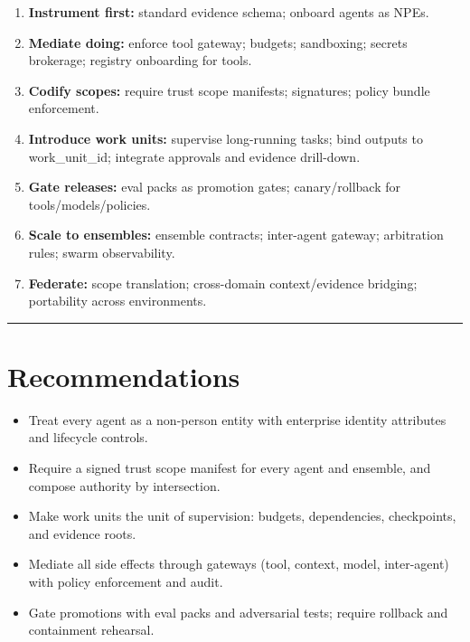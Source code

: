 \documentclass[11pt]{article}
\begin{document}
\begin{enumerate}
\def\labelenumi{\arabic{enumi}.}
\tightlist
\item
  \textbf{Instrument first:} standard evidence schema; onboard agents as
  NPEs.
\item
  \textbf{Mediate doing:} enforce tool gateway; budgets; sandboxing;
  secrets brokerage; registry onboarding for tools.
\item
  \textbf{Codify scopes:} require trust scope manifests; signatures;
  policy bundle enforcement.
\item
  \textbf{Introduce work units:} supervise long-running tasks; bind
  outputs to work\_unit\_id; integrate approvals and evidence
  drill-down.
\item
  \textbf{Gate releases:} eval packs as promotion gates; canary/rollback
  for tools/models/policies.
\item
  \textbf{Scale to ensembles:} ensemble contracts; inter-agent gateway;
  arbitration rules; swarm observability.
\item
  \textbf{Federate:} scope translation; cross-domain context/evidence
  bridging; portability across environments.
\end{enumerate}

\vspace{2pt}\begin{center}\rule{0.62\linewidth}{0.6pt}\end{center}\vspace{2pt}

\hypertarget{recommendations}{%
\section{Recommendations}\label{recommendations}}

\begin{itemize}
\tightlist
\item
  Treat every agent as a non-person entity with enterprise identity
  attributes and lifecycle controls.
\item
  Require a signed trust scope manifest for every agent and ensemble,
  and compose authority by intersection.
\item
  Make work units the unit of supervision: budgets, dependencies,
  checkpoints, and evidence roots.
\item
  Mediate all side effects through gateways (tool, context, model,
  inter-agent) with policy enforcement and audit.
\item
  Gate promotions with eval packs and adversarial tests; require
  rollback and containment rehearsal.
\end{itemize}
\end{document}
